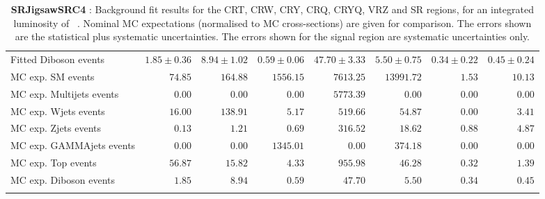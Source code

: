 \begin{table}
\begin{center}
{\begin{tabular*}{\textwidth}{@{\extracolsep{\fill}}lrrrrrrr}
        Fitted Diboson events         & $1.85 \pm 0.36$          & $8.94 \pm 1.02$          & $0.59 \pm 0.06$          & $47.70 \pm 3.33$          & $5.50 \pm 0.75$          & $0.34 \pm 0.22$          & $0.45 \pm 0.24$              \\
 \noalign{\smallskip}\hline\noalign{\smallskip}
MC exp. SM events              & $74.85$          & $164.88$          & $1556.15$          & $7613.25$          & $13991.72$          & $1.53$          & $10.13$              \\
\noalign{\smallskip}\hline\noalign{\smallskip}
        MC exp. Multijets events         & $0.00$          & $0.00$          & $0.00$          & $5773.39$          & $0.00$          & $0.00$          & $0.00$              \\
        MC exp. Wjets events         & $16.00$          & $138.91$          & $5.17$          & $519.66$          & $54.87$          & $0.00$          & $3.41$              \\
        MC exp. Zjets events         & $0.13$          & $1.21$          & $0.69$          & $316.52$          & $18.62$          & $0.88$          & $4.87$              \\
        MC exp. GAMMAjets events         & $0.00$          & $0.00$          & $1345.01$          & $0.00$          & $374.18$          & $0.00$          & $0.00$              \\
        MC exp. Top events         & $56.87$          & $15.82$          & $4.33$          & $955.98$          & $46.28$          & $0.32$          & $1.39$              \\
        MC exp. Diboson events         & $1.85$          & $8.94$          & $0.59$          & $47.70$          & $5.50$          & $0.34$          & $0.45$              \\
\noalign{\smallskip}\hline\noalign{\smallskip}
\end{tabular*}
}
\end{center}
\caption{{\bf SRJigsawSRC4} : Background fit results for the CRT, CRW, CRY, CRQ, CRYQ, VRZ and SR regions, for an integrated luminosity of \ourintlumi~\ifb. Nominal MC expectations (normalised to MC cross-sections) are given for comparison. The errors shown are the statistical plus systematic uncertainties. The errors shown for the signal region are systematic uncertainties only.}
\label{table.results.systematics.in.logL.fit.CRT.CRW.CRY.CRQ.CRYQ.VRZ.SR.SRJigsawSRC4}
\end{table}
%